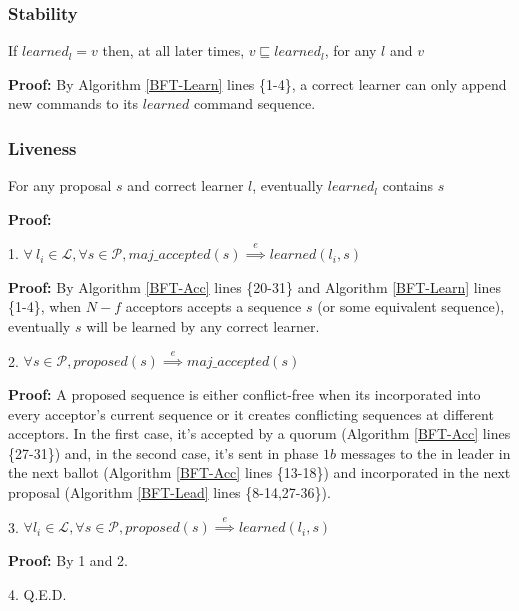 \subsubsection{Stability}
\begin{theorem}
If $learned_l = v$ then, at all later times, $v \sqsubseteq learned_l$, for any $l$ and $v$ \par \label{S-T1}
\end{theorem} 
\textbf{Proof:} By Algorithm \ref{BFT-Learn} lines \{1-4\}, a correct learner can only append new commands to its $learned$ command sequence.

\subsubsection{Liveness}
\begin{theorem}
For any proposal $s$ and correct learner $l$, eventually $learned_l$ contains $s$ \label{L-T1} \par
\end{theorem} 
\textbf{Proof:} \par
1. $\forall\ l_i \in \mathcal{L},\forall s \in \mathcal{P}, maj\_accepted(s) \overset{e}{\implies} learned(l_i,s)$ \par
\indent\indent\parbox{\linewidth}{\textbf{Proof:} By Algorithm \ref{BFT-Acc} lines \{20-31\} and Algorithm \ref{BFT-Learn} lines \{1-4\}, when $N-f$ acceptors accepts a sequence $s$ (or some equivalent sequence), eventually $s$ will be learned by any correct learner.}\par
2. $\forall s \in \mathcal{P}, proposed(s) \overset{e}{\implies} maj\_accepted(s)$ \par
\indent\indent\parbox{\linewidth}{\textbf{Proof:} A proposed sequence is either conflict-free when its incorporated into every acceptor's current sequence or it creates conflicting sequences at different acceptors. In the first case, it's accepted by a quorum (Algorithm \ref{BFT-Acc} lines \{27-31\}) and, in the second case, it's sent in phase $1b$ messages to the in leader in the next ballot (Algorithm \ref{BFT-Acc} lines \{13-18\}) and incorporated in the next proposal (Algorithm \ref{BFT-Lead} lines \{8-14,27-36\}).} \par
3. $\forall l_i \in \mathcal{L}, \forall s \in \mathcal{P}, proposed(s) \overset{e}{\implies} learned(l_i,s)$ \par
\indent\indent\textbf{Proof:} By 1 and 2. \par
4. Q.E.D.